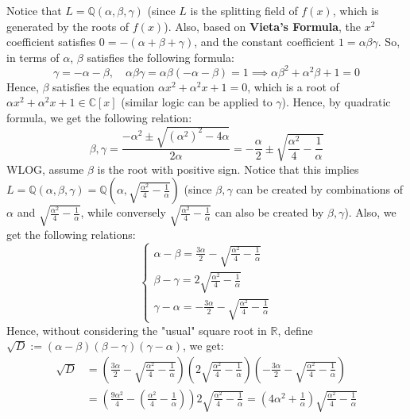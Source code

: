 \documentclass{article}
\newcommand{\QQ}{\mathbb{Q}}
\newcommand{\RR}{\mathbb{R}}
\newcommand{\CC}{\mathbb{C}}
\begin{document}
Notice that $L=\QQ(\alpha,\beta,\gamma)$ (since $L$ is the splitting field of $f(x)$, which is generated by the roots of $f(x)$). Also, based on \textbf{Vieta's Formula}, the $x^2$ coefficient satisfies $0 = -(\alpha+\beta+\gamma)$, and the constant coefficient $1=\alpha\beta\gamma$. So, in terms of $\alpha$, $\beta$ satisfies the following formula:
\begin{equation}
    \label{eq:1}
    \gamma = -\alpha-\beta,\quad \alpha\beta\gamma = \alpha\beta(-\alpha-\beta)=1 \implies \alpha \beta^2 + \alpha^2\beta + 1 = 0
\end{equation}
Hence, $\beta$ satisfies the equation $\alpha x^2+\alpha^2x +1=0$, which is a root of $\alpha x^2+\alpha^2x+1\in \CC[x]$ (similar logic can be applied to $\gamma$). Hence, by quadratic formula, we get the following relation:
\begin{equation}
    \label{eq:2}
    \beta,\gamma = \frac{-\alpha^2\pm \sqrt{(\alpha^2)^2-4\alpha}}{2\alpha} = -\frac{\alpha}{2}\pm \sqrt{\frac{\alpha^2}{4}-\frac{1}{\alpha}}
\end{equation} 
WLOG, assume $\beta$ is the root with positive sign. Notice that this implies $L=\QQ\left(\alpha,\beta,\gamma\right) = \QQ\left(\alpha,\sqrt{\frac{\alpha^2}{4}-\frac{1}{\alpha}}\right)$ (since $\beta,\gamma$ can be created by combinations of $\alpha$ and $\sqrt{\frac{\alpha^2}{4}-\frac{1}{\alpha}}$, while conversely $\sqrt{\frac{\alpha^2}{4}-\frac{1}{\alpha}}$ can also be created by $\beta,\gamma$). Also, we get the following relations:
\begin{equation}
    \label{eq:3}
    \begin{cases}
        \alpha-\beta = \frac{3\alpha}{2} - \sqrt{\frac{\alpha^2}{4}-\frac{1}{\alpha}}\\
        \beta-\gamma = 2\sqrt{\frac{\alpha^2}{4}-\frac{1}{\alpha}}\\
        \gamma-\alpha = -\frac{3\alpha}{2}-\sqrt{\frac{\alpha^2}{4}-\frac{1}{\alpha}}
    \end{cases}
\end{equation}
Hence, without considering the "usual" square root in $\RR$, define $\sqrt{D}:=(\alpha-\beta)(\beta-\gamma)(\gamma-\alpha)$, we get:
\begin{equation}
    \label{eq:4}
    \begin{split}
        \sqrt{D} &= \left(\frac{3\alpha}{2} - \sqrt{\frac{\alpha^2}{4}-\frac{1}{\alpha}}\right)\left(2\sqrt{\frac{\alpha^2}{4}-\frac{1}{\alpha}}\right)\left(-\frac{3\alpha}{2}-\sqrt{\frac{\alpha^2}{4}-\frac{1}{\alpha}}\right)\\
        &= \left(\frac{9\alpha^2}{4}-\left(\frac{\alpha^2}{4}-\frac{1}{\alpha}\right)\right)2\sqrt{\frac{\alpha^2}{4}-\frac{1}{\alpha}} = \left(4\alpha^2+\frac{1}{\alpha}\right)\sqrt{\frac{\alpha^2}{4}-\frac{1}{\alpha}}
    \end{split}
\end{equation}
\end{document}
